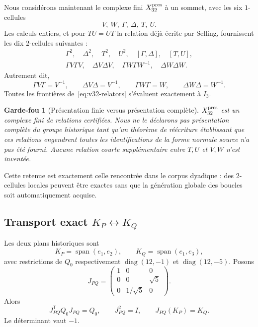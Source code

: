 \documentclass[11pt,a4paper]{article}
\newtheorem{guardrail}[theorem]{Garde-fou}
\begin{document}
Nous considérons maintenant le complexe fini $X_{32}^{\rm pres}$ à un sommet, avec les six
$1$-cellules
\begin{equation}\label{eq:v32-generators}
 \boxed{V,\ W,\ \Gamma,\ \Delta,\ T,\ U.}
\end{equation}
Les calculs entiers, et pour $TU=UT$ la relation déjà écrite par Selling, fournissent les dix
$2$-cellules suivantes :
\begin{equation}\label{eq:v32-relators}
\boxed{
\begin{gathered}
 \Gamma^2,\quad \Delta^2,\quad T^2,\quad U^2,\quad
 [\Gamma,\Delta],\quad[T,U],\\
 \Gamma V\Gamma V,\quad
 \Delta V\Delta V,\quad
 \Gamma W\Gamma W^{-1},\quad
 \Delta W\Delta W.
\end{gathered}}
\end{equation}
Autrement dit,
\[
 \Gamma V\Gamma=V^{-1},\qquad
 \Delta V\Delta=V^{-1},\qquad
 \Gamma W\Gamma=W,\qquad
 \Delta W\Delta=W^{-1}.
\]
Toutes les frontières de~\eqref{eq:v32-relators} s'évaluent exactement à $I_3$.

\begin{guardrail}[Présentation finie versus présentation complète]\label{guard:v32-presentation-completeness}
$X_{32}^{\rm pres}$ est un \emph{complexe fini de relations certifiées}. Nous ne le déclarons pas
présentation complète du groupe historique tant qu'un théorème de réécriture établissant que ces
relations engendrent toutes les identifications de la forme normale source n'a pas été fourni.
Aucune relation courte supplémentaire entre $T,U$ et $V,W$ n'est inventée.
\end{guardrail}

Cette retenue est exactement celle rencontrée dans le corpus dyadique : des $2$-cellules locales
peuvent être exactes sans que la génération globale des boucles soit automatiquement acquise.

\subsection{Transport exact $K_P\leftrightarrow K_Q$}

Les deux plans historiques sont
\[
 K_P=\operatorname{span}(e_1,e_2),\qquad
 K_Q=\operatorname{span}(e_1,e_3),
\]
avec restrictions de $Q_0$ respectivement $\operatorname{diag}(12,-1)$ et
$\operatorname{diag}(12,-5)$. Posons
\begin{equation}\label{eq:v32-JPQ}
 \boxed{
 J_{PQ}=\begin{pmatrix}
 1&0&0\\
 0&0&\sqrt5\\
 0&1/\sqrt5&0
 \end{pmatrix}.}
\end{equation}
Alors
\begin{equation}\label{eq:v32-JPQ-properties}
 \boxed{
 J_{PQ}^{\mathsf T}Q_0J_{PQ}=Q_0,
 \qquad J_{PQ}^2=I,
 \qquad J_{PQ}(K_P)=K_Q.}
\end{equation}
Le déterminant vaut $-1$.
\end{document}
